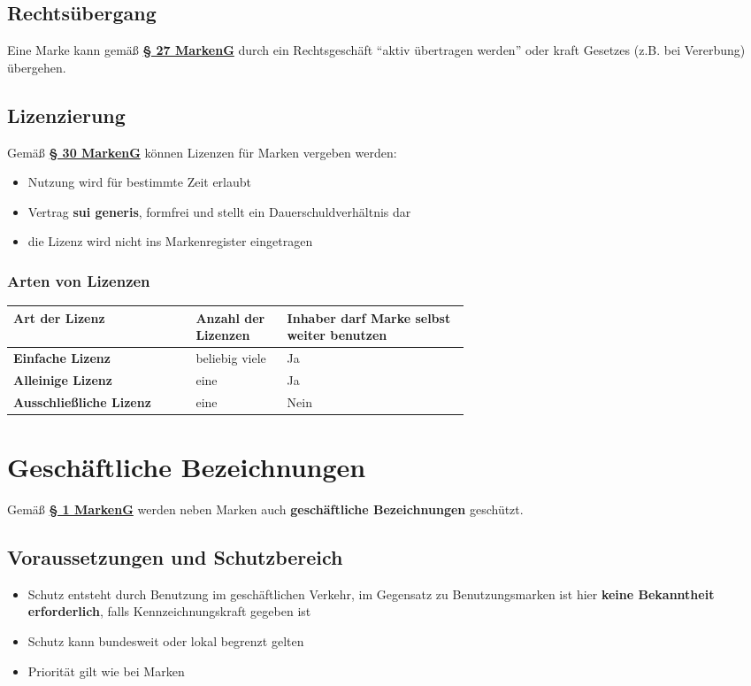 \documentclass[12pt,A4]{extarticle}
\newcommand{\highlight}[1]{\textcolor{highlightColor}{\textbf{#1}}}
\newcommand{\markenG}[2][]{\textbf{\textcolor{markenGesetzLink}{\href{https://www.gesetze-im-internet.de/markeng/__#2.html}{§ #2 \ifthenelse{\equal{#1}{}}{}{#1 }MarkenG}}}}
\begin{document}
\subsection{Rechtsübergang}
Eine Marke kann gemäß \markenG{27} durch ein Rechtsgeschäft ``aktiv übertragen werden'' oder kraft Gesetzes (z.B. bei Vererbung) übergehen.

\subsection{Lizenzierung}
Gemäß \markenG{30} können Lizenzen für Marken vergeben werden:
\begin{itemize}
  \item{Nutzung wird für bestimmte Zeit erlaubt}
  \item{Vertrag \textbf{sui generis}, formfrei und stellt ein Dauerschuldverhältnis dar}
  \item{die Lizenz wird nicht ins Markenregister eingetragen}
\end{itemize}

\subsubsection{Arten von Lizenzen}
\bgroup
\def\arraystretch{1.5}
\begin{table}[h]
  \begin{tabular}{|l|p{0.2\linewidth}|p{0.4\linewidth}|}
    \hline \rowcolor{gray!30}
    Art der Lizenz                  & Anzahl der Lizenzen & Inhaber darf Marke selbst weiter benutzen \\ \hline
    \textbf{Einfache Lizenz}        & beliebig viele      & Ja                                        \\ \hline
    \textbf{Alleinige Lizenz}       & eine                & Ja                                        \\ \hline
    \textbf{Ausschließliche Lizenz} & eine                & Nein                                      \\ \hline
  \end{tabular}
\end{table}

\section{Geschäftliche Bezeichnungen}
Gemäß \markenG{1} werden neben Marken auch \highlight{geschäftliche Bezeichnungen} geschützt.

\subsection{Voraussetzungen und Schutzbereich}
\begin{itemize}
  \item{Schutz entsteht durch Benutzung im geschäftlichen Verkehr, im Gegensatz zu Benutzungsmarken ist hier \textbf{keine Bekanntheit erforderlich}, falls Kennzeichnungskraft gegeben ist}
  \item{Schutz kann bundesweit oder lokal begrenzt gelten}
  \item{Priorität gilt wie bei Marken}
\end{itemize}
\end{document}
